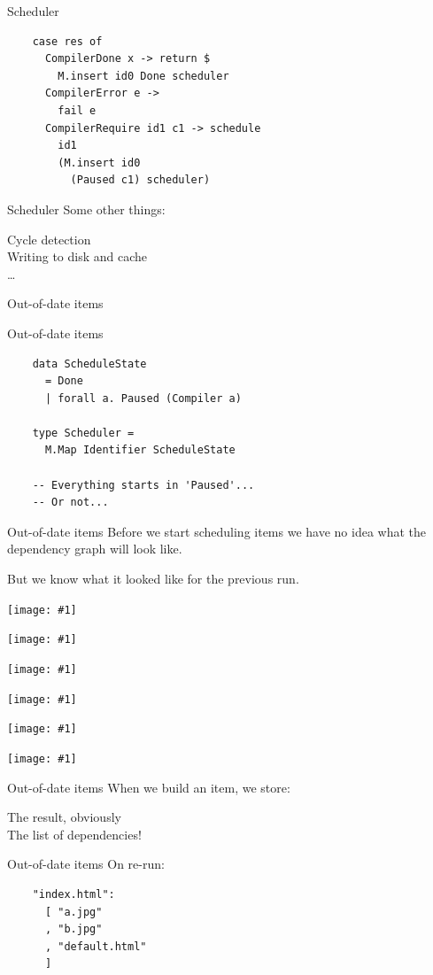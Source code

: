 \documentclass[20pt]{beamer}
\newcommand{\vspaced}{
    \vspace{5mm}
}
\newcommand{\imageframe}[1]{
    {
        \begin{frame}[plain]
        \begin{center}
        \texttt{[image: \#1]}
        \end{center}
        \end{frame}
    }
}
\newcommand{\chapterslide}[1]{
    {
        \begin{frame}[plain]
        \begin{center}
        \large{#1}
        \end{center}
        \end{frame}
    }
}
\begin{document}
\begin{frame}[fragile]{Scheduler}
    \begin{lstlisting}
    case res of
      CompilerDone x -> return $
        M.insert id0 Done scheduler
      CompilerError e ->
        fail e
      CompilerRequire id1 c1 -> schedule
        id1
        (M.insert id0
          (Paused c1) scheduler)
    \end{lstlisting}
\end{frame}

\begin{frame}{Scheduler}
    Some other things: \\
    \vspaced
    Cycle detection \\
    Writing to disk and cache \\
    \ldots
\end{frame}

\chapterslide{Out-of-date items}

\begin{frame}[fragile]{Out-of-date items}
    \begin{lstlisting}
    data ScheduleState
      = Done
      | forall a. Paused (Compiler a)

    type Scheduler =
      M.Map Identifier ScheduleState

    -- Everything starts in 'Paused'...
    -- Or not...
    \end{lstlisting}
\end{frame}

\begin{frame}{Out-of-date items}
    Before we start scheduling items we have no idea what the dependency graph
    will look like. \\
    \vspaced
    But we know what it looked like for the previous run.
\end{frame}

\imageframe{{images/deps-01.dot}.pdf}
\imageframe{{images/deps-02.dot}.pdf}
\imageframe{{images/deps-03.dot}.pdf}
\imageframe{{images/deps-04.dot}.pdf}
\imageframe{{images/deps-05.dot}.pdf}
\imageframe{{images/deps-06.dot}.pdf}

\begin{frame}{Out-of-date items}
    When we build an item, we store: \\
    \vspaced
    The result, obviously \\
    The list of dependencies!
\end{frame}

\begin{frame}[fragile]{Out-of-date items}
    On re-run: \\
    \vspaced
    \begin{lstlisting}
    "index.html":
      [ "a.jpg"
      , "b.jpg"
      , "default.html"
      ]
    \end{lstlisting}
\end{frame}
\end{document}
